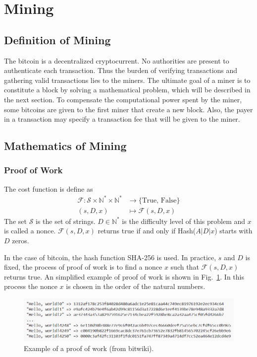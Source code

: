\documentclass[12pt,a4paper]{article}
\begin{document}
\section{Mining}
\label{sec:mining}
\subsection{Definition of Mining}
The bitcoin is a decentralized cryptocurrent. No authorities are present to authenticate each transaction. Thus the burden of verifying transactions and gathering valid transactions lies to the miners. The ultimate goal of a miner is to constitute a block by solving a mathematical problem, which will be described in the next section. To compensate the computational power spent by the miner, some bitcoins are given to the first miner that create a new block. Also, the payer in a transaction may specify a transaction fee that will be given to the miner. 
\subsection{Mathematics of Mining}
\subsubsection{Proof of Work}
The cost function is define as 
\begin{align*}
\mathcal{F}: \mathcal{S}\times \mathbb{N}^* \times \mathbb{N}^* &\longrightarrow \{\text{True, False}\}\\
(s, D, x)&\longmapsto \mathcal{F}(s, D, x)
\end{align*}
The set $\mathcal{S}$ is the set of strings. $D \in \mathbb{N}^*$ is the difficulty level of this problem and $x$ is called a nonce. $\mathcal{F}(s, D, x)$ returns true if and only if Hash($A|D|x$) starts with $D$ zeros. 


In the case of bitcoin, the hash function SHA-256 is used. In practice, $s$ and $D$ is fixed, the process of proof of work is to find a nonce $x$ such that $\mathcal{F}(s, D, x)$ returns true. An  simplified example of proof of work is shown in Fig.~\ref{fig:hash}. In this process the nonce $x$ is chosen in the order of the natural numbers.

\begin{figure}[tbph!]
	\centering
	\includegraphics[width=0.9\linewidth]{Hash}
	\caption{Example of a proof of work (from bitwiki).}
	\label{fig:hash}
\end{figure}
\end{document}
